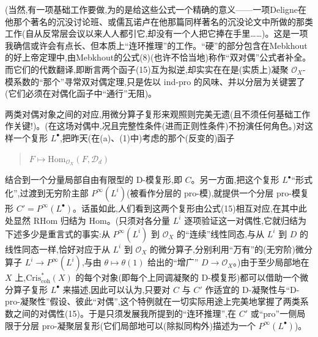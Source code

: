 \dmark{}(当然,有一项基础工作要做,为的是给这些公式一个精确的意义——一项Deligne在他那个著名的沉没讨论班、或儒瓦诺卢在他那篇同样著名的沉没论文中所做的那类工作(自从反常层会议以来人人都引它,却没有一个人把它捧在手里……)。这是一项我确信或许会有点长、但本质上“连环推理”的工作。“硬”的部分包含在Mebkhout的好上帝定理中,由Mebkhout的公式(8)(也许不恰当地)称作“双对偶”公式者补全。而它们的代数翻译,即断言两个函子(15)互为拟逆,却实实在在是(实质上)凝聚 $\mathcal{O}_{X}$-模系数的“那个”寻常双对偶定理,只是佐以 ind-pro 的风味、并以分层为关键罢了(它们必须在对偶化函子中“通行”无阻)。

\noindent 两类对偶对象之间的对应,用微分算子复形来观照则完美无遗(且不须任何基础工作作关键!)。(在这场对偶中,况且完整性条件(进而正则性条件)不扮演任何角色。)对这样一个复形 $L^{\bullet}$,把昨天(在(a)、(1)中)考虑的那个(反变的)函子
\begin{quote}
$F\mapsto \mathrm{Hom}_{\mathcal{O}_{X}}(F,\mathcal{D}_{d})$
\end{quote}
结合到一个分量局部自由有限型的 D-模复形,即 $C$。另一方面,把这个复形 $L^{\bullet}$“形式化”,过渡到无穷阶主部 $P^{\infty}(L^{i})$(被看作分层的 pro-模),就提供一个分层 pro-模复形 $C'=P^{\infty}(L^{\bullet})$。话虽如此,人们看到这两个复形由公式(15)相互对应,在其中此处显然 $\mathrm{RHom}$ 归结为 $\mathrm{Hom}$。(只须对各分量 $L^{i}$ 逐项验证这一对偶性,它就归结为下述多少是重言式的事实:从 $P^{\infty}(L^{i})$ 到 $\mathcal{O}_{X}$ 的“连续”线性同态,与从 $L^{i}$ 到 $D$ 的线性同态一样,恰好对应于从 $L^{i}$ 到 $\mathcal{O}_{X}$ 的微分算子,分别利用“万有”的(无穷阶)微分算子 $L^{i}\to P^{\infty}(L^{i})$,与由 $\theta\mapsto\theta(1)$ 给出的“增广” $D\to\mathcal{O}_{X}$。)由于至少局部地在 $X$ 上,$\mathrm{Cris}^{*}_{\mathrm{coh}}(X)$ 的每个对象(即每个上同调凝聚的 D-模复形)都可以借助一个微分算子复形 $L^{\bullet}$ 来描述,因此可以认为,只要对 $C$ 与 $C'$ 作适宜的 D-凝聚性与“D-pro-凝聚性”假设、彼此“对偶”,这个特例就在一切实际用途上完美地掌握了两类系数之间的对偶性(15)。于是只须发展我所提到的“连环推理”,在 $C'$ 或“pro”一侧局限于分层 pro-凝聚层复形\dmark{}(它们局部地可以(除拟同构外)描述为一个 $P^{\infty}(L^{\bullet})$)。

